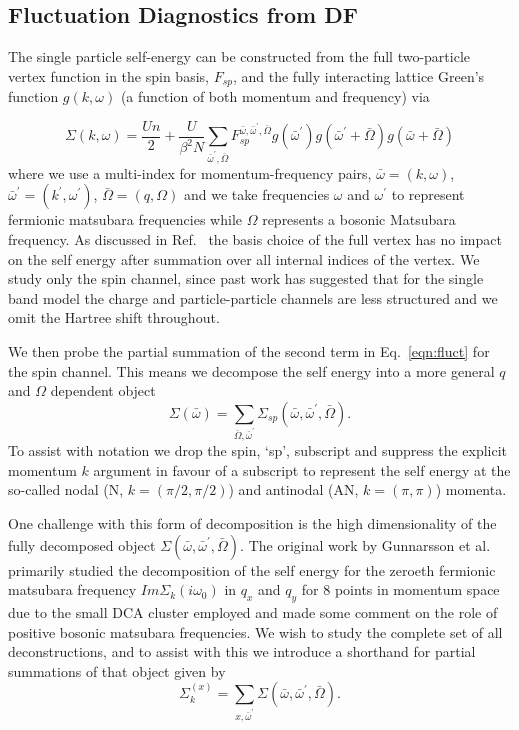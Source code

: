 \documentclass[twocolumn,notitlepage,prb,superscriptaddress,showpacs]{revtex4-1}
\begin{document}
\subsection{Fluctuation Diagnostics from DF}

The single particle self-energy can be constructed from the full two-particle vertex function in the spin basis, $F_{sp}$,\cite{Rohringer12} and the fully interacting lattice Green's function $g(k,\omega)$ (a function of both momentum and frequency) via

\begin{equation}\label{eqn:fluct}
     \Sigma(k,\omega)= \frac{Un}{2}+ \frac{U}{\beta^2 N} \sum \limits_{\bar{\omega}^\prime ,\bar{\Omega}} F_{sp}^{\bar{\omega},\bar{\omega}^\prime,\bar{\Omega}} g(\bar{\omega}^\prime)g(\bar{\omega}^\prime +\bar{\Omega}) g(\bar{\omega}+\bar{\Omega})
\end{equation}
where we use a multi-index for momentum-frequency pairs, $\bar{\omega}=(k,\omega)$, $\bar{\omega}^\prime=(k^\prime,\omega^\prime)$, $\bar{\Omega}=(q,\Omega)$ and we take frequencies $\omega$ and $\omega^\prime$ to represent fermionic matsubara frequencies while $\Omega$ represents a bosonic Matsubara frequency.
As discussed in Ref.~ the basis choice of the full vertex has no impact on the self energy after summation over all internal indices of the vertex.  We study only the spin channel, since past work has suggested that for the single band model the charge and particle-particle channels are less structured and we omit the Hartree shift throughout.

We then probe the partial summation of the second term in Eq.~\eqref{eqn:fluct} for the spin channel.  This means we decompose the self energy into a more general $q$ and $\Omega$ dependent object
\begin{equation}
    \Sigma(\bar{\omega})= \sum\limits_{\bar{\Omega},\bar{\omega}^\prime} \Sigma_{sp}(\bar{\omega},\bar{\omega}^\prime, \bar{\Omega}).
\end{equation}
To assist with notation we drop the spin, `sp', subscript and suppress the explicit momentum $k$ argument in favour of a subscript to represent the self energy at the so-called nodal (N, $k=(\pi/2,\pi/2)$) and antinodal (AN, $k=(\pi,\pi)$) momenta.

One challenge with this form of decomposition is the high dimensionality of the fully decomposed object $\Sigma(\bar{\omega},\bar{\omega}^\prime, \bar{\Omega})$.  The original work by Gunnarsson et al.\cite{gunnarsson:2015} primarily studied the decomposition of the self energy for the zeroeth fermionic matsubara frequency $Im\Sigma_k(i\omega_0)$ in $q_x$ and $q_y$ for 8 points in momentum space due to the small DCA cluster employed and made some comment on the role of positive bosonic matsubara frequencies.  We wish to study the complete set of all deconstructions, and to assist with this we introduce a shorthand for partial summations of that object given by
\begin{equation}\label{eqn:sumnotation}
    \Sigma_k^{(x)}= \sum\limits_{x, \bar{\omega}^\prime} \Sigma(\bar{\omega},\bar{\omega}^\prime, \bar{\Omega}).
\end{equation}
\end{document}
